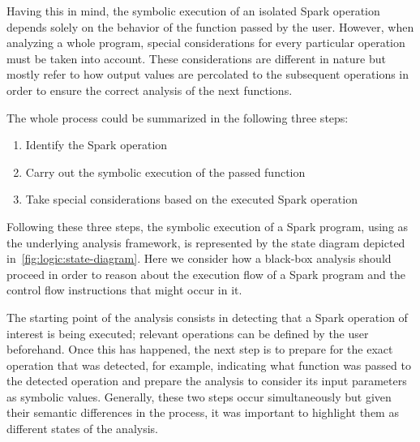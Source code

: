 %	
%	
%	
%	

Having this in mind, the symbolic execution of an isolated Spark operation depends solely on the behavior of the function passed by the user. However, when analyzing a whole program, special considerations for every particular operation must be taken into account. These considerations are different in nature but mostly refer to how output values are percolated to the subsequent operations in order to ensure the correct analysis of the next functions.

The whole process could be summarized in the following three steps:
\begin{enumerate}
	\item Identify the Spark operation
	\item Carry out the symbolic execution of the passed function
	\item Take special considerations based on the executed Spark operation
\end{enumerate}

Following these three steps, the symbolic execution of a Spark program, using \spf{} as the underlying analysis framework, is represented by the state diagram depicted in~\ref{fig:logic:state-diagram}. Here we consider how a black-box analysis should proceed in order to reason about the execution flow of a Spark program and the control flow instructions that might occur in it.

The starting point of the analysis consists in detecting that a Spark operation of interest is being executed; relevant operations can be defined by the user beforehand. Once this has happened, the next step is to prepare for the exact operation that was detected, for example, indicating what function was passed to the detected operation and prepare the \spf{} analysis to consider its input parameters as symbolic values. Generally, these two steps occur simultaneously but given their semantic differences in the process, it was important to highlight them as different states of the analysis.

